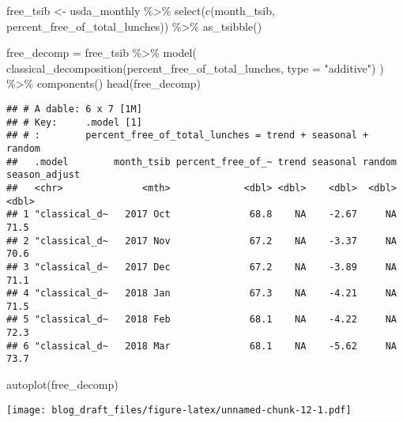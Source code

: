 \documentclass[
]{article}
\newenvironment{Shaded}{\begin{snugshade}}{\end{snugshade}}
\newcommand{\AttributeTok}[1]{\textcolor[rgb]{0.77,0.63,0.00}{#1}}
\newcommand{\FunctionTok}[1]{\textcolor[rgb]{0.00,0.00,0.00}{#1}}
\newcommand{\NormalTok}[1]{#1}
\newcommand{\OtherTok}[1]{\textcolor[rgb]{0.56,0.35,0.01}{#1}}
\newcommand{\SpecialCharTok}[1]{\textcolor[rgb]{0.00,0.00,0.00}{#1}}
\newcommand{\StringTok}[1]{\textcolor[rgb]{0.31,0.60,0.02}{#1}}
\begin{document}
\begin{Shaded}
\begin{Highlighting}[]
\NormalTok{free\_tsib }\OtherTok{\textless{}{-}}\NormalTok{ usda\_monthly }\SpecialCharTok{\%\textgreater{}\%} 
  \FunctionTok{select}\NormalTok{(}\FunctionTok{c}\NormalTok{(month\_tsib, percent\_free\_of\_total\_lunches)) }\SpecialCharTok{\%\textgreater{}\%} 
  \FunctionTok{as\_tsibble}\NormalTok{()}
\end{Highlighting}
\end{Shaded}

\begin{Shaded}
\begin{Highlighting}[]
\NormalTok{free\_decomp }\OtherTok{=}\NormalTok{ free\_tsib }\SpecialCharTok{\%\textgreater{}\%} 
  \FunctionTok{model}\NormalTok{(}
    \FunctionTok{classical\_decomposition}\NormalTok{(percent\_free\_of\_total\_lunches, }\AttributeTok{type =} \StringTok{"additive"}\NormalTok{)}
\NormalTok{  ) }\SpecialCharTok{\%\textgreater{}\%} 
  \FunctionTok{components}\NormalTok{()}
\FunctionTok{head}\NormalTok{(free\_decomp)}
\end{Highlighting}
\end{Shaded}

\begin{verbatim}
## # A dable: 6 x 7 [1M]
## # Key:     .model [1]
## # :        percent_free_of_total_lunches = trend + seasonal + random
##   .model        month_tsib percent_free_of_~ trend seasonal random season_adjust
##   <chr>              <mth>             <dbl> <dbl>    <dbl>  <dbl>         <dbl>
## 1 "classical_d~   2017 Oct              68.8    NA    -2.67     NA          71.5
## 2 "classical_d~   2017 Nov              67.2    NA    -3.37     NA          70.6
## 3 "classical_d~   2017 Dec              67.2    NA    -3.89     NA          71.1
## 4 "classical_d~   2018 Jan              67.3    NA    -4.21     NA          71.5
## 5 "classical_d~   2018 Feb              68.1    NA    -4.22     NA          72.3
## 6 "classical_d~   2018 Mar              68.1    NA    -5.62     NA          73.7
\end{verbatim}

\begin{Shaded}
\begin{Highlighting}[]
\FunctionTok{autoplot}\NormalTok{(free\_decomp)}
\end{Highlighting}
\end{Shaded}

\texttt{[image: blog\_draft\_files/figure-latex/unnamed-chunk-12-1.pdf]}
\end{document}
